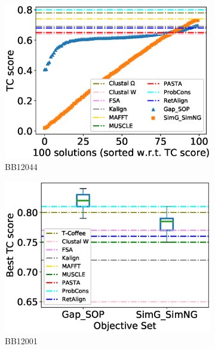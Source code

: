 \begin{figure}[!htbp]
\begin{adjustwidth}{-1.5cm}{-1cm}
\begin{subfigure}{0.22\textwidth}
			\includegraphics[width=\columnwidth]{Figure/summary/precomputedInit/Balibase/BB12044_tc_density_single_run_2}
			\caption{BB12044}
		\end{subfigure}
		\begin{subfigure}{0.22\textwidth}
			\includegraphics[width=\columnwidth]{Figure/summary/precomputedInit/Balibase/BB12001_objset_tc_rank_2}
			\caption{BB12001}
		\end{subfigure}	
		\begin{subfigure}{0.22\textwidth}

\end{subfigure}
\end{adjustwidth}
\end{figure}
